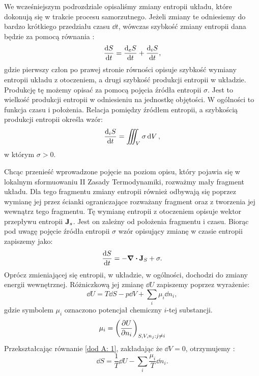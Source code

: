 \documentclass[10pt, a4paper, twoside, onecolumn]{article}
\numberwithin{equation}{section}
\begin{document}
	We wcześniejszym podrozdziale opisaliśmy zmiany entropii układu, które dokonują się w trakcie procesu samorzutnego. Jeżeli zmiany te odniesiemy do bardzo krótkiego przedziału czasu \(\dd{t}\), wówczas szybkość zmiany entropii dana będzie za pomocą równania \cite{mazur, prigogine}:
	\begin{equation}
		\dv{S}{t} = \dv{_{e}S}{t} + \dv{_{i}S}{t},
	\end{equation}
	gdzie pierwszy człon po prawej stronie równości opisuje szybkość wymiany entropii układu z otoczeniem, a drugi szybkość produkcji entropii w układzie. Produkcję tę możemy opisać za pomocą pojęcia źródła entropii \(\sigma\). Jest to wielkość produkcji entropii w odniesieniu na jednostkę objętości. W ogólności to funkcja czasu i położenia. Relacja pomiędzy źródłem entropii, a szybkością produkcji entropii określa wzór:
	\begin{equation}
		\dv{_{i}S}{t} = \iiint_{V}\sigma\dd{V},
	\end{equation}
	w którym \(\sigma>0\). \par
	Chcąc przenieść wprowadzone pojęcie na poziom opisu, który pojawia się w lokalnym sformuowaniu II Zasady Termodynamiki, rozważmy mały fragment układu. Dla tego fragmentu zmiany entropii również odbywają się poprzez wymianę jej przez ścianki ograniczające rozważany fragment oraz z tworzenia jej wewnątrz tego fragmentu. Tę wymianę entropii z otoczeniem opisuje wektor przepływu entropii \(\vb{J}_{s}\). Jest on zależny od położenia fragmentu i czasu. Biorąc pod uwagę pojęcie źródła entropii \(\sigma\) wzór opisujący zmianę w czasie entropii zapiszemy jako:
	\begin{equation} \label{dod A: 5}
		\dv{S}{t} = -\div{\vb{J}_{S}} + \sigma.
	\end{equation}
	Oprócz zmieniającej się entropii, w układzie, w ogólności, dochodzi do zmiany energii wewnętrznej. Różniczkową jej zmianę $\dd{U}$ zapiszemy poprzez wyrażenie:
	\begin{equation}
		\dd{U}=T\dd{S}-p\dd{V}+\sum_{i}\mu_{i}\dd{n_{i}}, \label{dod A: 1}
	\end{equation}
	gdzie symbolem $\mu_{i}$ oznaczono potencjał chemiczny $i$-tej substancji. 
	\begin{equation}
		\mu_{i}=\left(\pdv{U}{n_{i}}\right)_{S, V, n_{j}: j\neq i}
	\end{equation}
	Przekształcając równanie \eqref{dod A: 1}, zakładając że $\dd{V}=0$, otrzymujemy \cite{pigon1}:
	\begin{equation}
		\dd{S}=\frac{1}{T}\dd{U}-\sum_{i}\frac{\mu_{i}}{T}\dd{n_{i}}. \label{dod A: 2}
	\end{equation}
\end{document}

